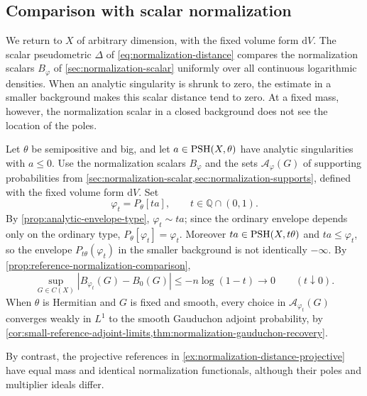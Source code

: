 \subsection{Comparison with scalar normalization}

We return to $X$ of arbitrary dimension, with the fixed volume form $\mathrm{d}V$. The scalar pseudometric $\Delta$ of \eqref{eq:normalization-distance} compares the normalization scalars $B_\varphi$ of \cref{sec:normalization-scalar} uniformly over all continuous logarithmic densities. When an analytic singularity is shrunk to zero, the estimate in a smaller background makes this scalar distance tend to zero. At a fixed mass, however, the normalization scalar in a closed background does not see the location of the poles.

\begin{example}\label{ex:analytic-reference-normalization}
Let $\theta$ be semipositive and big, and let $a\in\mathrm{PSH}(X,\theta)$ have analytic singularities with $a\leq0$. Use the normalization scalars $B_\varphi$ and the sets $\mathcal A_\varphi(G)$ of supporting probabilities from \cref{sec:normalization-scalar,sec:normalization-supports}, defined with the fixed volume form $\mathrm{d}V$. Set
\[
 \varphi_t=P_\theta[ta],\qquad t\in\mathbb Q\cap(0,1).
\]
By \cref{prop:analytic-envelope-type}, $\varphi_t\sim ta$; since the ordinary envelope depends only on the ordinary type, $P_\theta[\varphi_t]=\varphi_t$. Moreover $ta\in\mathrm{PSH}(X,t\theta)$ and $ta\leq\varphi_t$, so the envelope $P_{t\theta}(\varphi_t)$ in the smaller background is not identically $-\infty$. By \cref{prop:reference-normalization-comparison},
\[
 \sup_{G\in C(X)}|B_{\varphi_t}(G)-B_0(G)|
       \leq-n\log(1-t)\longrightarrow0
       \qquad(t\downarrow0).
\]
When $\theta$ is Hermitian and $G$ is fixed and smooth, every choice in $\mathcal A_{\varphi_t}(G)$ converges weakly in $L^1$ to the smooth Gauduchon adjoint probability, by \cref{cor:small-reference-adjoint-limits,thm:normalization-gauduchon-recovery}.
\end{example}

By contrast, the projective references in \cref{ex:normalization-distance-projective} have equal mass and identical normalization functionals, although their poles and multiplier ideals differ.
